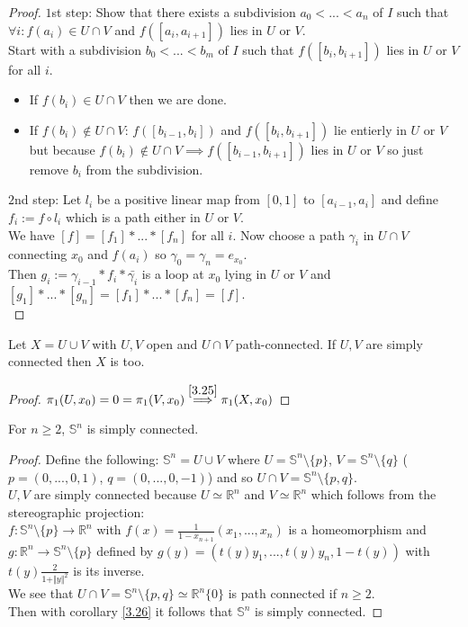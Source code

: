 \begin{proof}
    $1$st step: Show that there exists a subdivision $a_0<...<a_n$ of $I$ such that $\forall i:f(a_i)\in U\cap V$ and $f([a_i,a_{i+1}])$ lies in $U$ or $V$.\\
    Start with a subdivision $b_0<...<b_m$ of $I$ such that $f([b_i,b_{i+1}])$ lies in $U$ or $V$ \\
    for all $i$.
    \begin{itemize}
        \item If $f(b_i)\in U\cap V$ then we are done.
        \item If $f(b_i)\notin U\cap V$: $f([b_{i-1},b_i])$ and $f([b_i,b_{i+1}])$ lie entierly in $U$ or $V$ but because $f(b_i)\notin U\cap V\implies f([b_{i-1},b_{i+1}])$ lies in $U$ or $V$ so just remove $b_i$ from the subdivision.
    \end{itemize}
    $2$nd step: Let $l_i$ be a positive linear map from $[0,1]$ to $[a_{i-1},a_i]$ and define $f_i:=f\circ l_i$ which is a path either in $U$ or $V$.\\
    We have $[f]=[f_1]*...*[f_n]$ for all $i$. Now choose a path $\gamma_i$ in $U\cap V$ connecting $x_0$ and $f(a_i)$ so $\gamma_0=\gamma_n=e_{x_0}$.\\
    Then $g_i:=\gamma_{i-1}*f_i*\bar{\gamma_i}$ is a loop at $x_0$ lying in $U$ or $V$ and $[g_1]*...*[g_n]=[f_1]*...*[f_n]=[f]$.\\
\end{proof}
\begin{corollary}\label{3.26}
    Let $X=U\cup V$ with $U,V$ open and $U\cap V$ path-connected. If $U,V$ are simply connected then $X$ is too.
\end{corollary}
\begin{proof}
    $\pi_1(U,x_0)=0=\pi_1(V,x_0)\stackrel{\ref{3.25}}{\implies} \pi_1(X,x_0)$
\end{proof}
\begin{theorem}\label{3.27}
    For $n\geq 2$, $\mathbb{S}^n$ is simply connected.
\end{theorem}
\begin{proof}
    Define the following: $\mathbb{S}^n=U\cup V$ where $U=\mathbb{S}^n\setminus\{p\}$, $V=\mathbb{S}^n\setminus\{q\}$ ($p=(0,...,0,1)$, $q=(0,...,0,-1)$) and so $U\cap V=\mathbb{S}^n\setminus\{p,q\}$.\\
    $U,V$ are simply connected because $U\simeq\mathbb{R}^n$ and $V\simeq\mathbb{R}^n$ which follows from the stereographic projection:\\
    $f:\mathbb{S}^n\setminus\{p\}\to\mathbb{R}^n$ with $f(x)=\frac{1}{1-x_{n+1}}(x_1,...,x_n)$ is a homeomorphism and\\
    $g:\mathbb{R}^n\to\mathbb{S}^n\setminus\{p\}$ defined by $g(y)=(t(y)y_1,...,t(y)y_n,1-t(y))$ with $t(y)\frac{2}{1+\Vert y\Vert^2}$ is its inverse.\\
    We see that $U\cap V=\mathbb{S}^n\setminus\{p,q\}\simeq\mathbb{R}^n\{0\}$ is path connected if $n\geq 2$.\\
    Then with corollary \ref{3.26} it follows that $\mathbb{S}^n$ is simply connected.
\end{proof}

